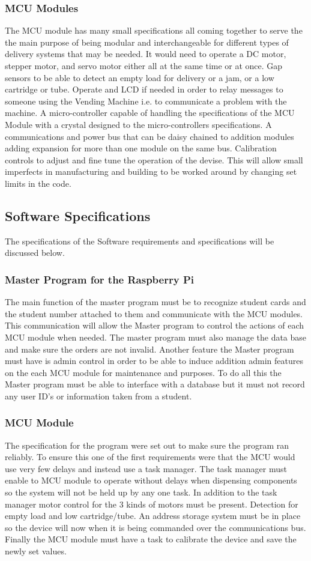 \documentclass[a4paper,11pt]{article}
\numberwithin{figure}{subsection}
\begin{document}
\subsubsection{MCU Modules}
The MCU module has many small specifications all coming together to serve the the main purpose of being modular and interchangeable for different types of delivery systems that may be needed. It would need to operate a DC motor, stepper motor, and servo motor either all at the same time or at once. Gap sensors to be able to detect an empty load for delivery or a jam, or a low cartridge or tube. Operate and LCD if needed in order to relay messages to someone using the Vending Machine i.e. to communicate a problem with the machine. A micro-controller capable of handling the specifications of the MCU Module with a crystal designed to the micro-controllers specifications. A communications and power bus that can be daisy chained to addition modules adding expansion for more than one module on the same bus. Calibration controls to adjust and fine tune the operation of the devise. This will allow small imperfects in manufacturing and building to be worked around by changing set limits in the code.
\subsection{Software Specifications}
The specifications of the Software requirements and specifications will be discussed below.
\subsubsection{Master Program for the Raspberry Pi}
The main function of the master program must be to recognize student cards and the student number attached to them and communicate with the MCU modules. This communication will allow the Master program to control the actions of each MCU module when needed. The master program must also manage the data base and make sure the orders are not invalid. Another feature the Master program must have is admin control in order to be able to induce addition admin features on the each MCU module for maintenance and purposes. To do all this the Master program must be able to interface with a database but it must not record any user ID's or information taken from a student.
\subsubsection{MCU Module}
The specification for the program were set out to make sure the program ran reliably. To ensure this one of the first requirements were that the MCU would use very few delays and instead use a task manager. The task manager must enable to MCU module to operate without delays when dispensing components so the system will not be held up by any one task. In addition to the task manager motor control for the 3 kinds of motors must be present. Detection for empty load and low cartridge/tube. An address storage system must be in place so the device will now when it is being commanded over the communications bus. Finally the MCU module must have a task to calibrate the device and save the newly set values.
\end{document}
